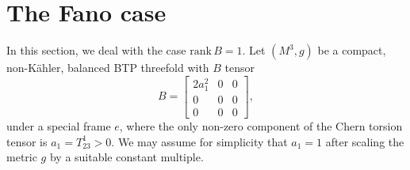 \documentclass{amsart}
\numberwithin{equation}{section}
\theoremstyle{definition}
\renewcommand{\1}{\mathds{1}}
\renewcommand{\>}{\rightarrow}
\begin{document}
\vspace{0.4cm}


\section{The Fano case}\label{FANO}
In this section, we deal with the case $\mathrm{rank}\,B=1$.
Let $(M^3,g)$ be a compact, non-K\"ahler, balanced BTP threefold with $B$ tensor
\[ B= \begin{bmatrix} 2a_1^2 & 0 & 0 \\ 0 & 0 & 0 \\ 0 & 0 & 0 \end{bmatrix}\!\!,\]
under a special frame $e$, where the only non-zero component of the Chern torsion tensor is $a_1=T^1_{23} >0$. We may assume for simplicity that $a_1=1$ after  scaling  the metric $g$ by a suitable constant multiple.
\end{document}
